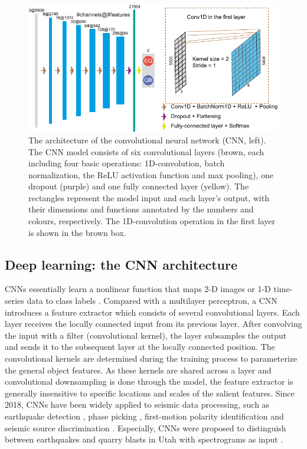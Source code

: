 \documentclass{gji}
\begin{document}
\begin{figure}
\centering
\includegraphics[width=.99\textwidth]{CNN6.pdf}
\caption{The architecture of the convolutional neural network (CNN, left). The CNN model consists of six convolutional layers (brown, each including four basic operations: 1D-convolution, batch normalization, the ReLU activation function and max pooling), one dropout (purple) and one fully connected layer (yellow). The rectangles represent the model input and each layer’s output, with their dimensions and functions annotated by the numbers and colours, respectively. The 1D-convolution operation in the first layer is shown in the brown box.}
\label{cnn6}
\end{figure}

\subsection{Deep learning: the CNN architecture}
CNNs essentially learn a nonlinear function that maps 2-D images or 1-D time-series data to class labels \citep{lecun}. Compared with a multilayer perceptron, a CNN introduces a feature extractor which consists of several convolutional layers. Each layer receives the locally connected input from its previous layer. After convolving the input with a filter (convolutional kernel), the layer subsamples the output and sends it to the subsequent layer at the locally connected position. The convolutional kernels are determined during the training process to parameterize the general object features. As these kernels are shared across a layer and convolutional downsampling is done through the model, the feature extractor is generally insensitive to specific locations and scales of the salient features. Since 2018, CNNs have been widely applied to seismic data processing, such as earthquake detection \citep{perol}, phase picking \citep{gpd,zhulijun,phasenet}, first-motion polarity identification \citep{polarity} and seismic source discrimination \citep{linville_19,liu,tibi_compare,kong}. Especially, CNNs were proposed to distinguish between earthquakes and quarry blasts in Utah with spectrograms as input \citep{linville_19,tibi_compare}.
\end{document}
